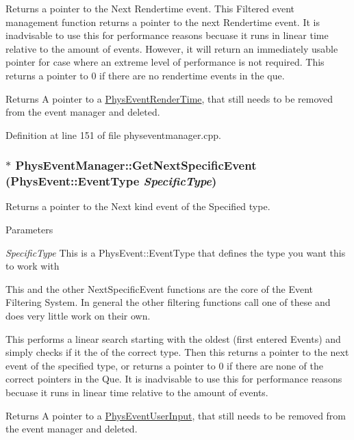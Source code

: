 Returns a pointer to the Next Rendertime event. This Filtered event management function returns a pointer to the next Rendertime event. It is inadvisable to use this for performance reasons becuase it runs in linear time relative to the amount of events. However, it will return an immediately usable pointer for case where an extreme level of performance is not required. This returns a pointer to 0 if there are no rendertime events in the que. \begin{DoxyReturn}{Returns}
A pointer to a \hyperlink{classPhysEventRenderTime}{PhysEventRenderTime}, that still needs to be removed from the event manager and deleted. 
\end{DoxyReturn}


Definition at line 151 of file physeventmanager.cpp.\hypertarget{classPhysEventManager_a56e45572c2fb84131f7d55c060c7ac21}{
\subsubsection[{GetNextSpecificEvent}]{ $\ast$ PhysEventManager::GetNextSpecificEvent (PhysEvent::EventType {\em SpecificType})}}
\label{d5/dd7/classPhysEventManager_a56e45572c2fb84131f7d55c060c7ac21}


Returns a pointer to the Next kind event of the Specified type. 
\begin{DoxyParams}{Parameters}
\item[{\em SpecificType}]This is a PhysEvent::EventType that defines the type you want this to work with\end{DoxyParams}
This and the other NextSpecificEvent functions are the core of the Event Filtering System. In general the other filtering functions call one of these and does very little work on their own. \par
 This performs a linear search starting with the oldest (first entered Events) and simply checks if it the of the correct type. Then this returns a pointer to the next event of the specified type, or returns a pointer to 0 if there are none of the correct pointers in the Que. It is inadvisable to use this for performance reasons becuase it runs in linear time relative to the amount of events. \begin{DoxyReturn}{Returns}
A pointer to a \hyperlink{classPhysEventUserInput}{PhysEventUserInput}, that still needs to be removed from the event manager and deleted. 
\end{DoxyReturn}


